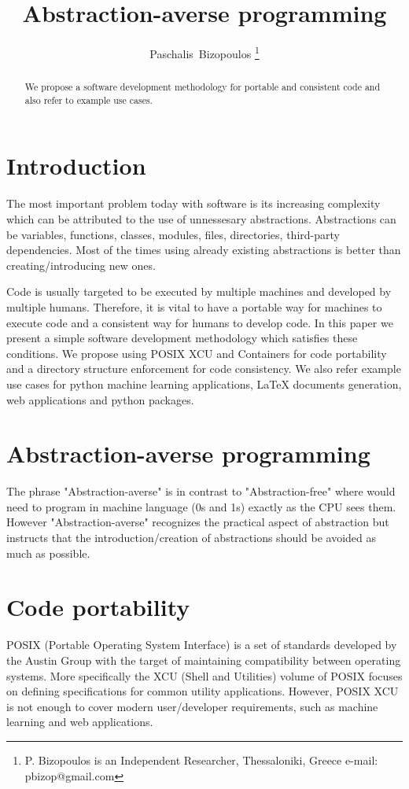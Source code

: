 \documentclass[journal]{IEEEtran}
\begin{document}
\title{Abstraction-averse programming}

\author{Paschalis~Bizopoulos
\thanks{P. Bizopoulos is an Independent Researcher, Thessaloniki, Greece e-mail: pbizop@gmail.com}}

\maketitle

\begin{abstract}
	We propose a software development methodology for portable and consistent code and also refer to example use cases.
\end{abstract}

\section{Introduction}
The most important problem today with software is its increasing complexity which can be attributed to the use of unnessesary abstractions.
Abstractions can be variables, functions, classes, modules, files, directories, third-party dependencies.
Most of the times using already existing abstractions is better than creating/introducing new ones.

Code is usually targeted to be executed by multiple machines and developed by multiple humans.
Therefore, it is vital to have a portable way for machines to execute code and a consistent way for humans to develop code.
In this paper we present a simple software development methodology which satisfies these conditions.
We propose using POSIX XCU and Containers for code portability and a directory structure enforcement for code consistency.
We also refer example use cases for python machine learning applications, \LaTeX{} documents generation, web applications and python packages.

\section{Abstraction-averse programming}
The phrase "Abstraction-averse" is in contrast to "Abstraction-free" where would need to program in machine language (0s and 1s) exactly as the CPU sees them.
However "Abstraction-averse" recognizes the practical aspect of abstraction but instructs that the introduction/creation of abstractions should be avoided as much as possible.

\section{Code portability}
POSIX (Portable Operating System Interface) is a set of standards developed by the Austin Group with the target of maintaining compatibility between operating systems.
More specifically the XCU (Shell and Utilities) volume of POSIX focuses on defining specifications for common utility applications.
However, POSIX XCU is not enough to cover modern user/developer requirements, such as machine learning and web applications.
\end{document}
